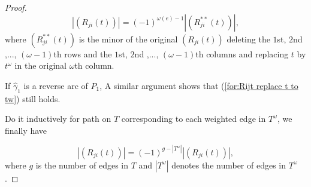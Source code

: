 \documentclass[10pt,a4paper]{amsart}
\begin{document}
\begin{proof}
\begin{equation}
|\left(R_{ji}(t)\right)|=(-1)^{\omega(e)-1}|\left(R_{ji}^{**}(t)\right)|, \label{for:Rijt replace t to tw}
\end{equation}
where $\left(R_{ji}^{**}(t)\right)$ is the minor of the original $\left(R_{ji}(t)\right)$ deleting the $1$st, $2$nd ,..., $(\omega-1)$th rows and the $1$st, $2$nd ,..., $(\omega-1)$th columns and replacing $t$ by $t^{\omega}$ in the original $\omega$th column.

If $\hat{\gamma}_{1}$ is a reverse arc of $P_{1}$, A similar argument shows that (\ref{for:Rijt replace t to tw}) still holds.

Do it inductively for path on $T$ corresponding to each weighted edge in $T^{\omega}$, we finally have

\begin{equation}
|\left(R_{ji}(t)\right)|=(-1)^{g-|T^{\omega}|}|\left(R_{ji}(t)\right)|, \nonumber
\end{equation}
where $g$ is the number of edges in $T$ and $|T^{\omega}|$ denotes the number of edges in $T^{\omega}$.
\end{proof}
\end{document}
